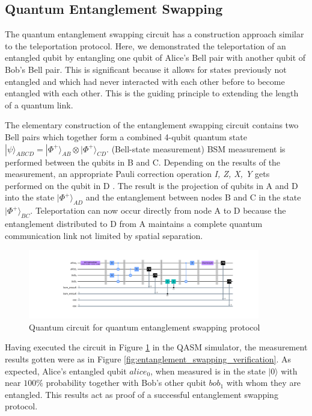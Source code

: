 \documentclass[11pt]{article}
\begin{document}
\subsection{Quantum Entanglement Swapping}
The quantum entanglement swapping circuit has a construction approach similar to the teleportation protocol. Here, we demonstrated the teleportation of an entangled qubit by entangling one qubit of Alice's Bell pair with another qubit of Bob's Bell pair. This is significant because it allows for states previously not entangled and which had never interacted with each other before to become entangled with each other. This is the guiding principle to extending the length of a quantum link.

The elementary construction of the entanglement swapping circuit contains two Bell pairs which together form a combined 4-qubit quantum state $|\psi\rangle_{ABCD} = |\Phi^{+}\rangle_{AB} \otimes |\Phi^{+}\rangle_{CD}$. (Bell-state measurement) BSM measurement is performed between the qubits in B and C. Depending on the results of the measurement, an appropriate Pauli correction operation {\textit{I, Z, X, Y}} gets performed on the qubit in D \cite{Das_2021}. The result is the projection of qubits in A and D into the state $|\Phi^{+}\rangle_{AD}$ and the entanglement between nodes B and C in the state $|\Phi^{+}\rangle_{BC}$. Teleportation can now occur directly from node A to D because the entanglement distributed to D from A maintains a complete quantum communication link not limited by spatial separation.
\begin{figure}[ht]
    \centering
    \includegraphics[width=0.90\textwidth]{figures/entanglement_swapping.jpg}
    \caption[Entanglement swapping protocol circuit]{Quantum circuit for quantum entanglement swapping protocol}
    \label{fig:entanglement_swapping}
\end{figure}
Having executed the circuit in Figure \ref{fig:entanglement_swapping} in the QASM simulator, the measurement results gotten were as in Figure \ref{fig:entanglement_swapping_verification}. As expected, Alice's entangled qubit $alice_0$, when measured is in the state $|0\rangle$ with near $100\%$ probability together with Bob's other qubit $bob_1$ with whom they are entangled. This results act as proof of a successful entanglement swapping protocol.
\end{document}
